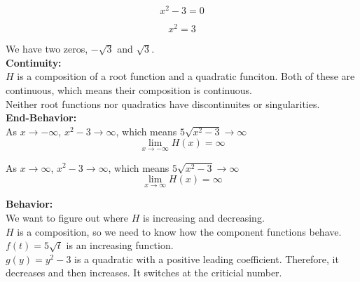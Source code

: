 \documentclass{ximera}
\begin{document}
\[
x^2-3 = 0
\]

\[
x^2 = 3
\]


We have two zeros, $-\sqrt{3}$ and $\sqrt{3}$. \\




\textbf{\textcolor{blue!55!black}{Continuity:}} \\


$H$ is a composition of a root function and a quadratic funciton.  Both of these are continuous, which means their composition is continuous. \\

Neither root functions nor quadratics have discontinuites or singularities. \\





\textbf{\textcolor{blue!55!black}{End-Behavior:}} \\


As $x \to -\infty$, $x^2 -3 \to \infty$, which means $5 \sqrt{x^2 -3} \to \infty$ \\

\[
\lim\limits_{x \to -\infty} H(x) = \infty
\]

As $x \to \infty$, $x^2 -3 \to \infty$, which means $5 \sqrt{x^2 -3} \to \infty$ \\


\[
\lim\limits_{x \to \infty} H(x) = \infty
\]











\textbf{\textcolor{blue!55!black}{Behavior:}} \\


We want to figure out where $H$ is increasing and decreasing. \\

$H$ is a composition, so we need to know how the component functions behave. \\





$f(t) = 5 \sqrt{t}$ is an increasing function. \\

$g(y) = y^2 - 3$ is a quadratic with a positive leading coefficient.  Therefore, it decreases and then increases.   It switches at the criticial number.\\
\end{document}
